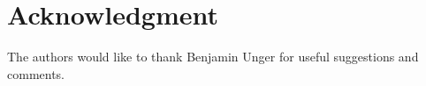 \documentclass[final,reqno]{siamltex}
\begin{document}
\section*{Acknowledgment} The authors would like to thank Benjamin Unger for useful 
suggestions and comments.


%

\end{document}
